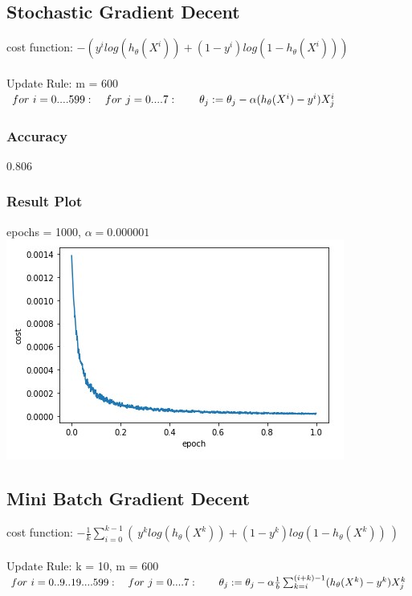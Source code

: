 \documentclass[10pt]{article}
\begin{document}
\subsection{Stochastic Gradient Decent}
cost function:
    $ -(y^{i}log(h_{\theta}(X^{i})) +  (1-y^{i})log(1-h_{\theta}(X^{i})))$
    \\\\
Update Rule: m = 600\\
    $ for~i=0....599:\\
    ~~~for~j=0....7:\\
    ~~~~~~\theta_{j} := \theta_{j} - \alpha (h_{\theta}(X^{i}) - y^{i}) X^{i}_{j}$
    
\subsubsection{Accuracy}
    0.806
    
\subsubsection{Result Plot}
epochs = 1000, $\alpha = 0.000001$\\

\includegraphics[scale=.6]{log_stoch}


\subsection{Mini Batch Gradient Decent}
cost function:
    $-\frac{1}{k} \sum_{i=0}^{k-1}(~y^{k}log(h_{\theta}(X^{k})) +  (1-y^{k})log(1-h_{\theta}(X^{k}))~)$
    \\\\
Update Rule: k = 10, m = 600\\
    $ for~i=0..9..19....599:\\
    ~~~for~j=0....7:\\
    ~~~~~~\theta_{j} := \theta_{j} - \alpha \frac{1}{b} \sum_{k=i}^{(i+k)-1}(h_{\theta}(X^{k}) - y^{k}) X^{k}_{j}$
\end{document}
